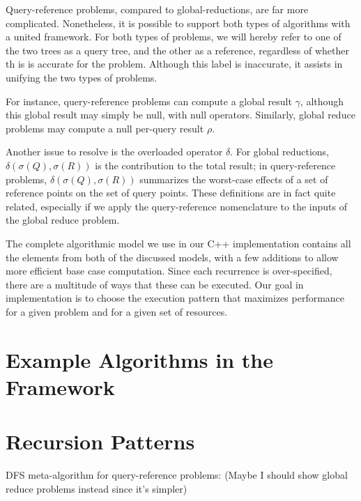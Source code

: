 \documentclass[times, 10pt,twocolumn]{article}
\newcommand{\allrho}{\rho}
\newcommand{\allsigma}{\sigma}
\begin{document}
Query-reference problems, compared to global-reductions, are far more complicated.
Nonetheless, it is possible to support both types of algorithms with a united framework.
For both types of problems, we will hereby refer to one of the two trees as a query tree, and the other as a reference, regardless of whether th is is accurate for the problem.
Although this label is inaccurate, it assists in unifying the two types of problems.

For instance, query-reference problems can compute a global result $\gamma$, although this global result may simply be null, with null operators.
Similarly, global reduce problems may compute a null per-query result $\allrho$.

Another issue to resolve is the overloaded operator $\delta$.
For global reductions, $\delta(\allsigma(Q), \allsigma(R))$ is the contribution to the total result; in query-reference problems, $\delta(\allsigma(Q), \allsigma(R))$ summarizes the worst-case effects of a set of reference points on the set of query points.
These definitions are in fact quite related, especially if we apply the query-reference nomenclature to the inputs of the global reduce problem.

The complete algorithmic model we use in our C++ implementation contains all the elements from both of the discussed models, with a few additions to allow more efficient base case computation.
Since each recurrence is over-specified, there are a multitude of ways that these can be executed.
Our goal in implementation is to choose the execution pattern that maximizes performance for a given problem and for a given set of resources.

\section{Example Algorithms in the Framework}

\section{Recursion Patterns}

DFS meta-algorithm for query-reference problems:
(Maybe I should show global reduce problems instead since it's simpler)
\end{document}
